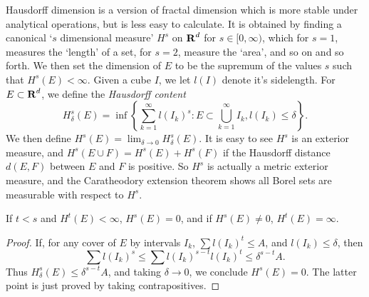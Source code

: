 Hausdorff dimension is a version of fractal dimension which is more stable under analytical operations, but is less easy to calculate. It is obtained by finding a canonical `$s$ dimensional measure' $H^s$ on $\operatorname{\mathbf{R}}^d$ for $s \in [0,\infty)$, which for $s = 1$, measures the `length' of a set, for $s = 2$, measure the `area', and so on and so forth. We then set the dimension of $E$ to be the supremum of the values $s$ such that $H^s(E) < \infty$. Given a cube $I$, we let $l(I)$ denote it's sidelength. For $E \subset \operatorname{\mathbf{R}}^d$, we define the \emph{Hausdorff content}
%
\[ H_\delta^s(E) = \inf \left\{ \sum_{k = 1}^\infty l(I_k)^s : E \subset \bigcup_{k = 1}^\infty I_k, l(I_k) \leq \delta \right\}. \]
%
We then define $H^s(E) = \lim_{\delta \to 0} H_\delta^s(E)$. It is easy to see $H^s$ is an exterior measure, and $H^s(E \cup F) = H^s(E) + H^s(F)$ if the Hausdorff distance $d(E,F)$ between $E$ and $F$ is positive. So $H^s$ is actually a metric exterior measure, and the Caratheodory extension theorem shows all Borel sets are measurable with respect to $H^s$.



\begin{lemma}
	If $t < s$ and $H^t(E) < \infty$, $H^s(E) = 0$, and if $H^s(E) \neq 0$, $H^t(E) = \infty$.
\end{lemma}
\begin{proof}
	If, for any cover of $E$ by intervals $I_k$, $\sum l(I_k)^t \leq A$, and $l(I_k) \leq \delta$, then
	\[ \sum l(I_k)^s \leq \sum l(I_k)^{s-t} l(I_k)^t \leq \delta^{s-t} A. \]
	Thus $H^s_\delta(E) \leq \delta^{s-t} A$, and taking $\delta \to 0$, we conclude $H^s(E) = 0$. The latter point is just proved by taking contrapositives.
\end{proof}

